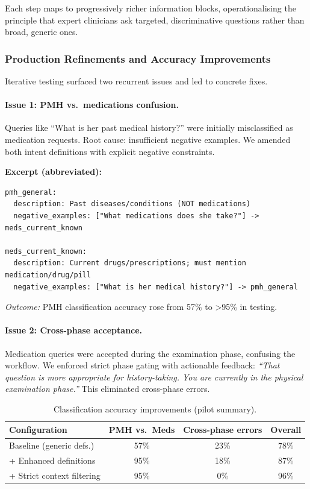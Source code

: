 Each step maps to progressively richer information blocks, operationalising the
principle that expert clinicians ask targeted, discriminative questions rather
than broad, generic ones.

\subsubsection{Production Refinements and Accuracy Improvements}

Iterative testing surfaced two recurrent issues and led to concrete fixes.

\paragraph{Issue 1: PMH vs.\ medications confusion.}
Queries like ``What is her past medical history?'' were initially misclassified
as medication requests. Root cause: insufficient negative examples. We amended
both intent definitions with explicit negative constraints.

\noindent\textbf{Excerpt (abbreviated):}
\begin{verbatim}
pmh_general:
  description: Past diseases/conditions (NOT medications)
  negative_examples: ["What medications does she take?"] -> meds_current_known

meds_current_known:
  description: Current drugs/prescriptions; must mention medication/drug/pill
  negative_examples: ["What is her medical history?"] -> pmh_general
\end{verbatim}

\textit{Outcome:} PMH classification accuracy rose from 57\% to >95\% in testing.

\paragraph{Issue 2: Cross-phase acceptance.}
Medication queries were accepted during the examination phase, confusing the
workflow. We enforced strict phase gating with actionable feedback:
\emph{``That question is more appropriate for history-taking. You are currently
in the physical examination phase.''} This eliminated cross-phase errors.

\begin{table}[h]
\centering
\caption{Classification accuracy improvements (pilot summary).}
\label{tab:intent_accuracy}
\setlength{\tabcolsep}{6pt}
\renewcommand{\arraystretch}{1.15}
\begin{tabular}{lccc}
\toprule
\textbf{Configuration} & \textbf{PMH vs.\ Meds} & \textbf{Cross-phase errors} & \textbf{Overall} \\
\midrule
Baseline (generic defs.)        & 57\% & 23\% & 78\% \\
+ Enhanced definitions           & 95\% & 18\% & 87\% \\
+ Strict context filtering       & 95\% & 0\%  & 96\% \\
\bottomrule
\end{tabular}
\end{table}

